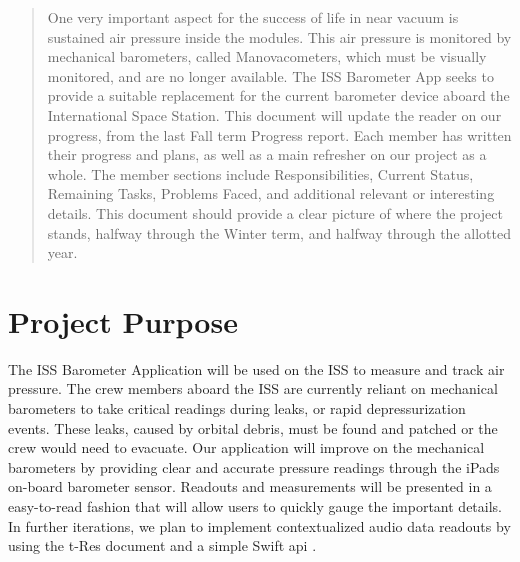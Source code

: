 \documentclass[onecolumn, draftclsnofoot,10pt, compsoc]{IEEEtran}
\def \CapstoneProjectName{ISS Barometer App }
\begin{document}
\begin{titlepage}
\begin{singlespace}
\begin{abstract}
        One very important aspect for the success of life in near vacuum is sustained air pressure inside the modules.
        This air pressure is monitored by mechanical barometers, called Manovacometers, which must be visually monitored, and are no longer available.
        The \CapstoneProjectName seeks to provide a suitable replacement for the current barometer device aboard the International Space Station.
        This document will update the reader on our progress, from the last Fall term Progress report.
        Each member has written their progress and plans, as well as a main refresher on our project as a whole.
        The member sections include Responsibilities, Current Status, Remaining Tasks, Problems Faced, and additional relevant or interesting details.
        This document should provide a clear picture of where the project stands, halfway through the Winter term, and halfway through the allotted year.
        \end{abstract}
    \end{singlespace}
\end{titlepage}
\newpage
{}
\tableofcontents
\clearpage

\section{Project Purpose}
The ISS Barometer Application will be used on the ISS to measure and track air pressure.
The crew members aboard the ISS are currently reliant on mechanical barometers to take critical readings during leaks, or rapid depressurization events.
These leaks, caused by orbital debris, must be found and patched or the crew would need to evacuate.
Our application will improve on the mechanical barometers by providing clear and accurate pressure readings through the iPads on-board barometer sensor.
Readouts and measurements will be presented in a easy-to-read fashion that will allow users to quickly gauge the important details.
In further iterations, we plan to implement contextualized audio data readouts by using the t-Res document and a simple Swift api \cite{probStat}.
\end{document}
